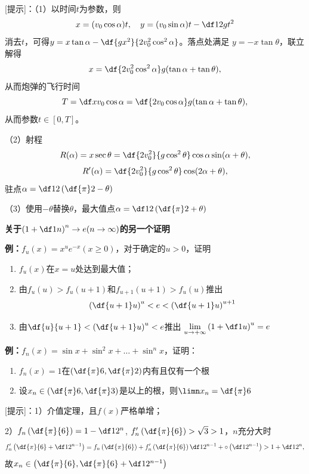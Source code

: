 [提示]：（1）以时间$t$为参数，则
$$x=(v_0\cos\alpha)t,\quad y=(v_0\sin\alpha)t-\df12gt^2$$
消去$t$，可得$y=x\tan\alpha-\df{gx^2}{2v_0^2\cos^2\alpha}$。落点处满足
$y=-x\tan\theta$，联立解得
$$x=\df{2v_0^2\cos^2\alpha}g(\tan\alpha+\tan\theta),$$
从而炮弹的飞行时间
$$T=\df x{v_0\cos\alpha}=\df{2v_0\cos\alpha}g(\tan\alpha+\tan\theta),$$
从而参数$t\in[0,T]$。

（2）射程
$$R(\alpha)=x\sec\theta=\df{2v_0^2}{g\cos^2\theta}\cos\alpha\sin(\alpha+\theta),$$
$$R'(\alpha)=\df{2v_0^2}{g\cos^2\theta}\cos(2\alpha+\theta),$$
驻点$\alpha=\df12\left(\df{\pi}2-\theta\right)$

（3）使用$-\theta$替换$\theta$，最大值点$\alpha=\df12\left(\df{\pi}2+\theta\right)$

\begin{shaded}
{\bf 关于$\left(1+\df1n\right)^n\to e(n\to\infty)$的另一个证明}

{\bf 例：}$f_u(x)=x^ue^{-x}(x\geq0)$，对于确定的$u>0$，证明
\begin{enumerate}[(1)]
  \setlength{\itemindent}{1cm}
  \item $f_u(x)$在$x=u$处达到最大值；
  \item 由$f_u(u)>f_u(u+1)$和$f_{u+1}(u+1)>f_u(u)$推出
  $$\left(\df{u+1}u\right)^u<e<\left(\df{u+1}u\right)^{u+1}$$
  \item 由$\df{u}{u+1}<\left(\df{u+1}u\right)^u<e$推出
  $\lim\limits_{u\to+\infty}\left(1+\df1u\right)^u=e$
\end{enumerate}
\end{shaded}

% 

% 

{\bf 例：}$f_n(x)=\sin x+\sin^2x+\ldots+\sin^nx$，证明：
\begin{enumerate}[1)]
  \setlength{\itemindent}{1cm}
  \item $f_n(x)=1$在$\left(\df{\pi}6,\df{\pi}2\right)$内有且仅有一个根
  \item 设$x_n\in\left(\df{\pi}6,\df{\pi}3\right)$是以上的根，则$\limn x_n=\df{\pi}6$
\end{enumerate}

[提示]：1）介值定理，且$f(x)$严格单增；

2）$f_n\left(\df{\pi}{6}\right)=1-\df1{2^n}$,
$f'_n\left(\df{\pi}{6}\right)>\sqrt
3>1$，$n$充分大时 $$f'_n\left(\df{\pi}{6}+\df1{2^{n-1}}\right)
=f_n\left(\df{\pi}{6}\right)+f'_n\left(\df{\pi}{6}\right)\df1{2^{n-1}}
+\circ\left(\df1{2^{n-1}}\right)>1+\df1{2^n},$$
故$x_n\in\left(\df{\pi}{6},\df{\pi}{6}+\df1{2^{n-1}}\right)$

